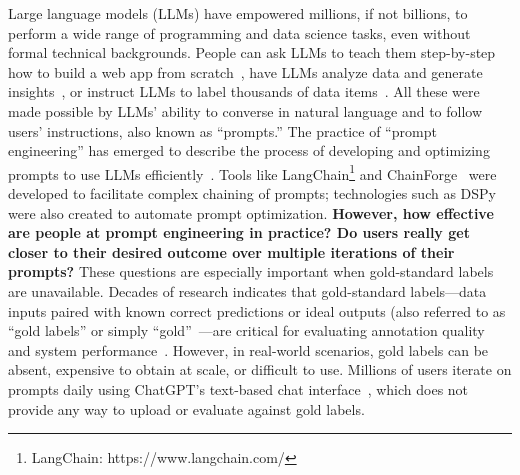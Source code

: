 Large language models (LLMs) have empowered millions, if not billions, to perform a wide range of programming and data science tasks, even without formal technical backgrounds.
People can ask LLMs to teach them step-by-step how to build a web app from scratch~\cite{voronin2024development}, %
have LLMs analyze data and generate insights~\cite{ma-etal-2023-insightpilot,laradji2023capture}, %
or instruct LLMs to label thousands of data items~\cite{10.1145/3613904.3642834,horych2024promises,he-etal-2024-annollm}. %
All these were made possible by LLMs' ability to converse in natural language and to follow users' instructions, also known as ``prompts.'' 
The practice of ``prompt engineering'' has emerged to describe the process of developing and optimizing prompts to use LLMs efficiently~\cite{chen2023unleashing,wang2023review,giray2023prompt}.
Tools like LangChain\footnote{LangChain: https://www.langchain.com/} and ChainForge~\cite{arawjo2024chainforge} were developed to facilitate complex chaining of prompts; technologies such as DSPy~\cite{khattab2023dspy} were also created to automate prompt optimization.
\textbf{However, how effective are people at prompt engineering in practice? 
Do users really get closer to their desired outcome over multiple iterations of their prompts?}
These questions are especially important when gold-standard labels are unavailable.
Decades of research indicates that gold-standard labels---data inputs paired with known correct predictions or ideal outputs (also referred to as ``gold labels'' or simply ``gold''~\cite{abdalla2023hurdles,wang2024impact, snow2008cheap,kilgarriff1998gold,silveira2014gold, wiebe1999development,sorokin2008utility}---are critical for evaluating annotation quality~\cite{han2020crowd,gadiraju2015training,nahum2024llms} and system performance~\cite{daka2014survey,ellims2004unit,hamill2004unit}. 
However, in real-world scenarios, gold labels can be absent, expensive to obtain at scale, or difficult to use.
Millions of users iterate on prompts daily using ChatGPT's text-based chat interface~\cite{mortensen2024chatgpt, cnbc2024openai}, which does not provide any way to upload or evaluate against gold labels. 
